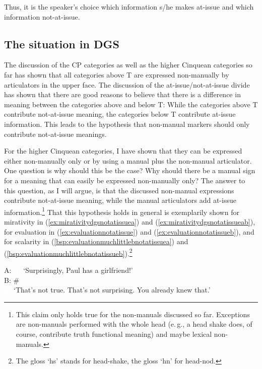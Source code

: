 \noindent Thus, it is the speaker's choice which information s/he makes at-issue and which information not-at-issue. 

\subsection{The situation in DGS}

The discussion of the CP categories as well as the higher Cinquean categories so far has shown that all categories above T are expressed non-manually by articulators in the upper face. The discussion of the at-issue/not-at-issue divide has shown that there are good reasons to believe that there is a difference in meaning between the categories above and below T: While the categories above T contribute not-at-issue meaning, the categories below T contribute at-issue information. This leads to the hypothesis that non-manual markers should only contribute not-at-issue meanings. 

For the higher Cinquean categories, I have shown that they can be expressed either non-manually only or by using a manual plus the non-manual articulator. One question is why should this be the case? Why should there be a manual sign for a meaning that can easily be expressed non-manually only? The answer to this question, as I will argue, is that the discussed non-manual expressions contribute not-at-issue meaning, while the manual articulators add at-issue information.\footnote{ This claim only holds true for the non-manuals discussed so far. Exceptions are non-manuals performed with the whole head (e.\,g., a head shake does, of course, contribute truth functional meaning) and maybe lexical non-manuals.} That this hypothesis holds in general is exemplarily shown for mirativity in (\ref{ex:mirativitydgsnotatissuea}) and (\ref{ex:mirativitydgsnotatissueab}), for evaluation in (\ref{ex:evaluationnotatissue}) and (\ref{ex:evaluationnotatissueb}), and for scalarity in (\ref{bsp:evaluationmuchlittlebnotatissuea}) and (\ref{bsp:evaluationmuchlittlebnotatissueb}).\footnote{ The gloss `hs' stands for head-shake, the gloss `hn' for head-nod.}


\begin{exe}
\ex\label{ex:mirativitydgsnotatissuea}
A: 
\glt \textcolor{white}{A: }`Surprisingly, Paul has a girlfriend!'\label{ex:mirativitydgsa} \\
B:  \#   \\
%
%
\textcolor{white}{A: }`That's not true. That's not surprising. You already knew that.'
\end{exe}



